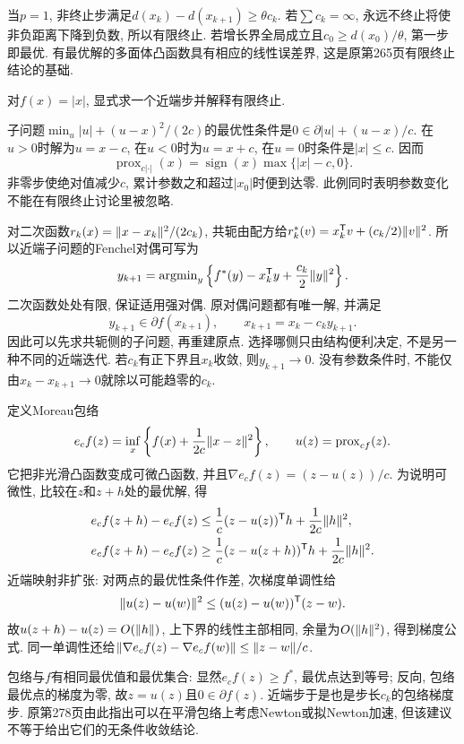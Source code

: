 当$p=1$, 非终止步满足$d(x_k)-d(x_{k+1})\ge\theta c_k$. 若$\sum c_k=\infty$, 永远不终止将使非负距离下降到负数, 所以有限终止. 若增长界全局成立且$c_0\ge d(x_0)/\theta$, 第一步即最优. 有最优解的多面体凸函数具有相应的线性误差界, 这是原第265页有限终止结论的基础.

\begin{example}
对$f(x)=|x|$, 显式求一个近端步并解释有限终止.
\end{example}
\begin{solution}
子问题$\min_u|u|+(u-x)^2/(2c)$的最优性条件是$0\in\partial|u|+(u-x)/c$. 在$u>0$时解为$u=x-c$, 在$u<0$时为$u=x+c$, 在$u=0$时条件是$|x|\le c$. 因而
\[
 \operatorname{prox}_{c|\cdot|}(x)=\operatorname{sign}(x)\max\{|x|-c,0\}.
\]
非零步使绝对值减少$c$, 累计参数之和超过$|x_0|$时便到达零. 此例同时表明参数变化不能在有限终止讨论里被忽略.
\end{solution}

对二次函数$r_{k}(x)=\lVert x-x_k\rVert^2/(2c_k)$, 共轭由配方给$r_k^*(v)=x_k^{\mathsf T} v+(c_k/2)\lVert v\rVert^2$. 所以近端子问题的Fenchel对偶可写为
\begin{equation}\label{eq:dual-proximal}
 y_{k+1}=\operatorname{argmin}_y\left\{f^*(y)-x_k^{\mathsf T} y+\frac{c_k}{2}\lVert y\rVert^2\right\}.
\end{equation}
二次函数处处有限, 保证适用强对偶. 原对偶问题都有唯一解, 并满足
\[
 y_{k+1}\in\partial f(x_{k+1}),\qquad
 x_{k+1}=x_k-c_k y_{k+1}.
\]
因此可以先求共轭侧的子问题, 再重建原点. 选择哪侧只由结构便利决定, 不是另一种不同的近端迭代. 若$c_k$有正下界且$x_k$收敛, 则$y_{k+1}\to0$. 没有参数条件时, 不能仅由$x_k-x_{k+1}\to0$就除以可能趋零的$c_k$.

定义Moreau包络
\[
 e_c f(z)=\inf_x\left\{f(x)+\frac1{2c}\lVert x-z\rVert^2\right\},\qquad u(z)=\operatorname{prox}_{cf}(z).
\]
它把非光滑凸函数变成可微凸函数, 并且$\nabla e_c f(z)=(z-u(z))/c$. 为说明可微性, 比较在$z$和$z+h$处的最优解, 得
\begin{align*}
 e_cf(z+h)-e_cf(z)&\le\frac1c(z-u(z))^{\mathsf T} h+\frac1{2c}\lVert h\rVert^2,\\
 e_cf(z+h)-e_cf(z)&\ge\frac1c(z-u(z+h))^{\mathsf T} h+\frac1{2c}\lVert h\rVert^2.
\end{align*}
近端映射非扩张: 对两点的最优性条件作差, 次梯度单调性给
\[
 \lVert u(z)-u(w)\rVert^2\le(u(z)-u(w))^{\mathsf T}(z-w).
\]
故$u(z+h)-u(z)=O(\lVert h\rVert)$, 上下界的线性主部相同, 余量为$O(\lVert h\rVert^2)$, 得到梯度公式. 同一单调性还给\mbox{$\lVert \nabla e_cf(z)-\nabla e_cf(w)\rVert\le\lVert z-w\rVert/c$}.

包络与$f$有相同最优值和最优集合: 显然$e_cf(z)\ge f^*$, 最优点达到等号; 反向, 包络最优点的梯度为零, 故$z=u(z)$且$0\in\partial f(z)$. 近端步于是也是步长$c_k$的包络梯度步. 原第278页由此指出可以在平滑包络上考虑Newton或拟Newton加速, 但该建议不等于给出它们的无条件收敛结论.

